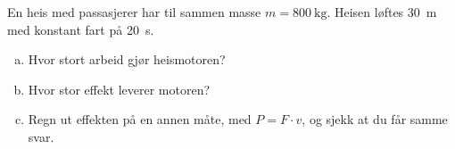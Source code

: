 %
En heis med passasjerer har til sammen masse $m = \SI{800}{\kilo\gram}$. Heisen løftes \SI{30}{\metre} med konstant fart på \SI{20}{\second}.
\begin{enumerate}[a)]
    \item Hvor stort arbeid gjør heismotoren?
    \item Hvor stor effekt leverer motoren?
    \item Regn ut effekten på en annen måte, med $P = F\cdot v$, og sjekk at du får samme svar.
\end{enumerate}
